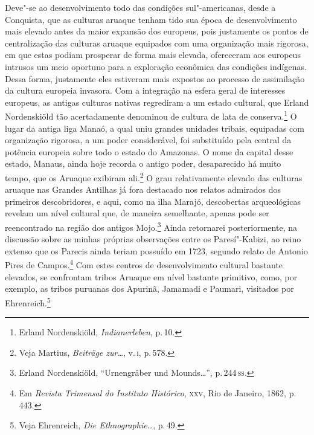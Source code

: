 Deve"-se ao desenvolvimento todo das condições sul"-americanas, desde a
Conquista, que as culturas aruaque tenham tido sua época de desenvolvimento
mais elevado antes da maior expansão dos europeus, pois justamente os
pontos de centralização das culturas aruaque equipados com uma
organização mais rigorosa, em que estas podiam prosperar de forma mais
elevada, ofereceram aos europeus intrusos um meio oportuno para a
exploração econômica das condições indígenas. Dessa forma, justamente
eles estiveram mais expostos ao processo de assimilação da cultura
europeia invasora. Com a integração na esfera geral de interesses
europeus, as antigas culturas nativas regrediram a um estado cultural,
que Erland Nordenskiöld tão acertadamente denominou de cultura de lata
de conserva.\footnote{Erland Nordenskiöld, \textit{Indianerleben}, p.\,10.} O lugar da antiga liga Manaó, a
qual uniu grandes unidades tribais, equipadas com organização rigorosa,
a um poder considerável, foi substituído pela central da potência
europeia sobre todo o estado do Amazonas. O nome da capital desse
estado, Manaus, ainda hoje recorda o antigo poder, desaparecido há muito
tempo, que os Aruaque exibiram ali.\footnote{Veja Martius, \textit{Beiträge
  zur\ldots}, v.\,\textsc{i}, p.\,578.} O grau relativamente elevado das culturas aruaque nas Grandes
Antilhas já fora destacado nos relatos admirados dos primeiros
descobridores, e aqui, como na ilha Marajó, descobertas arqueológicas
revelam um nível cultural que, de maneira semelhante, apenas pode ser
reencontrado na região dos antigos Mojo.\footnote{Erland Nordenskiöld,
  ``Urnengräber und Mounds\ldots'', p.\,244\,\textsc{ss}.} Ainda retornarei posteriormente, na discussão sobre as minhas
próprias observações entre os Paresí"-Kabizi, ao reino extenso que os
Parecis ainda teriam possuído em 1723, segundo relato de Antonio Pires
de Campos.\footnote{Em \textit{Revista Trimensal do Instituto Histórico}, \textsc{xxv},
  Rio de Janeiro, 1862, p.\,443.} Com estes centros de desenvolvimento
cultural bastante elevados, se confrontam tribos Aruaque em nível
bastante primitivo, como, por exemplo, as tribos puruanas dos Apurinã,
Jamamadi e Paumari, visitados por Ehrenreich.\footnote{Veja Ehrenreich,
  \textit{Die Ethnographie\ldots}, p.\,49.}

